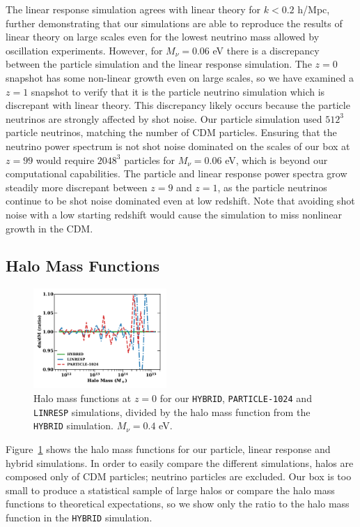 \documentclass[useAMS, usenatbib]{mnras}
\begin{document}
The linear response simulation agrees with linear theory for $k < 0.2$ h/Mpc, further demonstrating that our simulations are able to reproduce the results of linear theory on large scales even for the lowest neutrino mass allowed by oscillation experiments. However, for $M_\nu = 0.06$ eV there is a discrepancy between the particle simulation and the linear response simulation. The $z=0$ snapshot has some non-linear growth even on large scales, so we have examined a $z=1$ snapshot to verify that it is the particle neutrino simulation which is discrepant with linear theory. This discrepancy likely occurs because the particle neutrinos are strongly affected by shot noise. Our particle simulation used $512^3$ particle neutrinos, matching the number of CDM particles. Ensuring that the neutrino power spectrum is not shot noise dominated on the scales of our box at $z=99$ would require $2048^3$ particles for $M_\nu = 0.06$ eV, which is beyond our computational capabilities. The particle and linear response power spectra grow steadily more discrepant between $z=9$ and $z=1$, as the particle neutrinos continue to be shot noise dominated even at low redshift. Note that avoiding shot noise with a low starting redshift would cause the simulation to miss nonlinear growth in the CDM.

\subsection{Halo Mass Functions}
\label{sec:halomass}

\begin{figure}
  \includegraphics[width=0.45\textwidth]{nuplots/hmf-1.pdf}
\caption{Halo mass functions at $z=0$ for our \texttt{HYBRID}, \texttt{PARTICLE-1024} and \texttt{LINRESP} simulations, divided by the halo mass function from the \texttt{HYBRID} simulation. $M_\nu = 0.4$ eV.}
  \label{fig:halomass}
\end{figure}

Figure~\ref{fig:halomass} shows the halo mass functions for our particle, linear response and hybrid simulations. In order to easily compare the different simulations, halos are composed only of CDM particles; neutrino particles are excluded. Our box is too small to produce a statistical sample of large halos or compare the halo mass functions to theoretical expectations, so we show only the ratio to the halo mass function in the \texttt{HYBRID} simulation.
\end{document}
